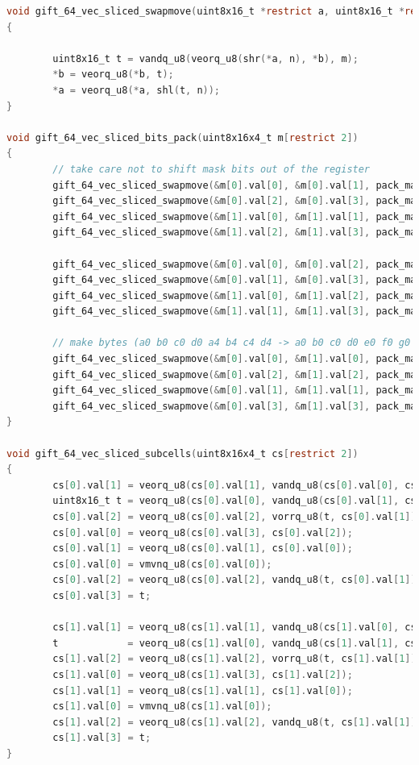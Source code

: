 \documentclass[12pt]{report}
\begin{document}
\begin{lstlisting}[language=c, caption={gift\_vec\_sliced.c}]
void gift_64_vec_sliced_swapmove(uint8x16_t *restrict a, uint8x16_t *restrict b, uint8x16_t m, int n)
{

        uint8x16_t t = vandq_u8(veorq_u8(shr(*a, n), *b), m);
        *b = veorq_u8(*b, t);
        *a = veorq_u8(*a, shl(t, n));
}

void gift_64_vec_sliced_bits_pack(uint8x16x4_t m[restrict 2])
{
        // take care not to shift mask bits out of the register
        gift_64_vec_sliced_swapmove(&m[0].val[0], &m[0].val[1], pack_mask_0, 1);
        gift_64_vec_sliced_swapmove(&m[0].val[2], &m[0].val[3], pack_mask_0, 1);
        gift_64_vec_sliced_swapmove(&m[1].val[0], &m[1].val[1], pack_mask_0, 1);
        gift_64_vec_sliced_swapmove(&m[1].val[2], &m[1].val[3], pack_mask_0, 1);

        gift_64_vec_sliced_swapmove(&m[0].val[0], &m[0].val[2], pack_mask_1, 2);
        gift_64_vec_sliced_swapmove(&m[0].val[1], &m[0].val[3], pack_mask_1, 2);
        gift_64_vec_sliced_swapmove(&m[1].val[0], &m[1].val[2], pack_mask_1, 2);
        gift_64_vec_sliced_swapmove(&m[1].val[1], &m[1].val[3], pack_mask_1, 2);

        // make bytes (a0 b0 c0 d0 a4 b4 c4 d4 -> a0 b0 c0 d0 e0 f0 g0 h0)
        gift_64_vec_sliced_swapmove(&m[0].val[0], &m[1].val[0], pack_mask_2, 4);
        gift_64_vec_sliced_swapmove(&m[0].val[2], &m[1].val[2], pack_mask_2, 4);
        gift_64_vec_sliced_swapmove(&m[0].val[1], &m[1].val[1], pack_mask_2, 4);
        gift_64_vec_sliced_swapmove(&m[0].val[3], &m[1].val[3], pack_mask_2, 4);
}

void gift_64_vec_sliced_subcells(uint8x16x4_t cs[restrict 2])
{
        cs[0].val[1] = veorq_u8(cs[0].val[1], vandq_u8(cs[0].val[0], cs[0].val[2]));
        uint8x16_t t = veorq_u8(cs[0].val[0], vandq_u8(cs[0].val[1], cs[0].val[3]));
        cs[0].val[2] = veorq_u8(cs[0].val[2], vorrq_u8(t, cs[0].val[1]));
        cs[0].val[0] = veorq_u8(cs[0].val[3], cs[0].val[2]);
        cs[0].val[1] = veorq_u8(cs[0].val[1], cs[0].val[0]);
        cs[0].val[0] = vmvnq_u8(cs[0].val[0]);
        cs[0].val[2] = veorq_u8(cs[0].val[2], vandq_u8(t, cs[0].val[1]));
        cs[0].val[3] = t;

        cs[1].val[1] = veorq_u8(cs[1].val[1], vandq_u8(cs[1].val[0], cs[1].val[2]));
        t            = veorq_u8(cs[1].val[0], vandq_u8(cs[1].val[1], cs[1].val[3]));
        cs[1].val[2] = veorq_u8(cs[1].val[2], vorrq_u8(t, cs[1].val[1]));
        cs[1].val[0] = veorq_u8(cs[1].val[3], cs[1].val[2]);
        cs[1].val[1] = veorq_u8(cs[1].val[1], cs[1].val[0]);
        cs[1].val[0] = vmvnq_u8(cs[1].val[0]);
        cs[1].val[2] = veorq_u8(cs[1].val[2], vandq_u8(t, cs[1].val[1]));
        cs[1].val[3] = t;
}


\end{lstlisting}
\end{document}
